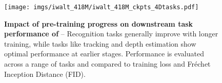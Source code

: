 \begin{figure}[b] 
\texttt{[image: imgs/iwalt\_418M/iwalt\_418M\_ckpts\_4Dtasks.pdf]}
\vspace{-6mm}
\caption{
\textbf{Impact of pre-training progress on downstream task performance of \iwalt} -- Recognition tasks generally improve with longer training, while tasks like tracking and depth estimation show optimal performance at earlier stages.  Performance is evaluated across a range of tasks and compared to training loss and Fréchet Inception Distance (FID).%
}
\label{fig:iwalt_training_progress}
\end{figure}
